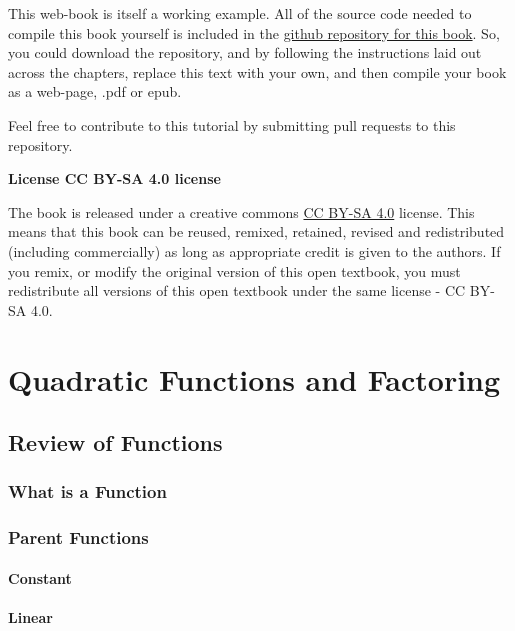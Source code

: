 \documentclass[]{book}
\begin{document}
This web-book is itself a working example. All of the source code needed to compile this book yourself is included in the \href{https://github.com/CrumpLab/OER_bookdown}{github repository for this book}. So, you could download the repository, and by following the instructions laid out across the chapters, replace this text with your own, and then compile your book as a web-page, .pdf or epub.

Feel free to contribute to this tutorial by submitting pull requests to this repository.

\textbf{License CC BY-SA 4.0 license}

The book is released under a creative commons \href{https://creativecommons.org/licenses/by-sa/4.0/}{CC BY-SA 4.0} license. This means that this book can be reused, remixed, retained, revised and redistributed (including commercially) as long as appropriate credit is given to the authors. If you remix, or modify the original version of this open textbook, you must redistribute all versions of this open textbook under the same license - CC BY-SA 4.0.

\hypertarget{Quadratics}{%
\chapter{Quadratic Functions and Factoring}\label{Quadratics}}

\hypertarget{review-of-functions}{%
\section{Review of Functions}\label{review-of-functions}}

\hypertarget{what-is-a-function}{%
\subsection{What is a Function}\label{what-is-a-function}}

\hypertarget{parent-functions}{%
\subsection{Parent Functions}\label{parent-functions}}

\hypertarget{constant}{%
\subsubsection{Constant}\label{constant}}

\hypertarget{linear}{%
\subsubsection{Linear}\label{linear}}
\end{document}
